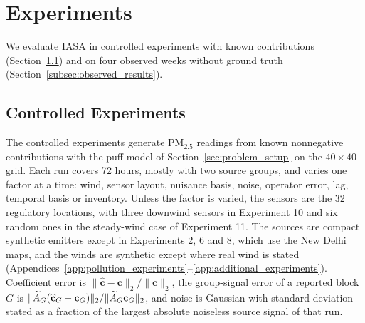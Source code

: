 \section{Experiments}
\label{sec:application}

We evaluate IASA in controlled experiments with known contributions
(Section~\ref{subsec:pollution_controlled}) and on four observed weeks without ground
truth (Section~\ref{subsec:observed_results}).

\subsection{Controlled Experiments}
\label{subsec:pollution_controlled}

The controlled experiments generate PM\(_{2.5}\) readings from known nonnegative
contributions with the puff model of Section~\ref{sec:problem_setup} on the
\(40\times40\) grid.  Each run covers 72 hours, mostly with two source groups, and varies one factor at a time:
wind, sensor layout, nuisance basis, noise, operator error, lag, temporal basis or
inventory.  Unless the factor is varied, the sensors are the 32 regulatory locations,
with three downwind sensors in Experiment 10 and six random ones in the steady-wind
case of Experiment 11.  The sources are compact synthetic emitters except in
Experiments 2, 6 and 8, which use the New Delhi maps, and the winds are synthetic
except where real wind is stated
(Appendices~\ref{app:pollution_experiments}--\ref{app:additional_experiments}).  Coefficient error is
\(\|\widehat{\mathbf c}-\mathbf c\|_2/\|\mathbf c\|_2\), the group-signal error of a
reported block \(G\) is \(\|\widetilde A_G(\widehat{\mathbf c}_G-\mathbf c_G)\|_2/\|\widetilde A_G\mathbf c_G\|_2\),
and noise is Gaussian with standard deviation stated as a fraction of the largest
absolute noiseless source signal of that run.


